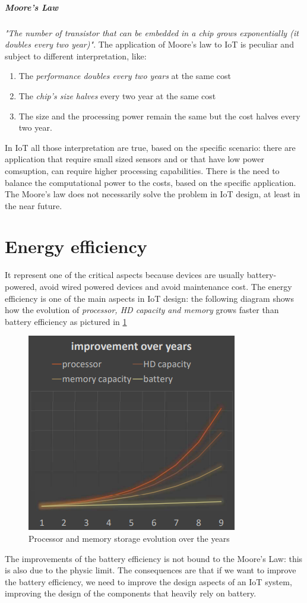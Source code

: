 \documentclass[10pt,a4paper]{report}
\theoremstyle{definition}
\begin{document}
\subparagraph{Moore's Law}\label{sec:moores-law}
\textit{"The number of transistor that can be embedded in a chip grows exponentially (it doubles every two year)"}.
The application of Moore's law to IoT is peculiar and subject to different interpretation, like: 
\begin{enumerate}
	\item 
	The \textit{performance doubles every two years} at the same cost
	\item 
	The \textit{chip's size halves} every two year at the same cost
	\item 
	The size and the processing power remain the same but the cost halves every two year.
	
\end{enumerate}
In IoT all those interpretation are true, based on the specific scenario: there are application that require small sized sensors and or that have low power comsuption, can require higher processing capabilities. There is the need to balance the computational power to the costs, based on the specific application.\\
The Moore's law does not necessarily solve the problem in IoT design, at least in the near future.
\section{Energy efficiency}\label{sec:energy-efficiency}
It represent one of the critical aspects because devices are usually battery-powered, avoid wired powered devices and avoid maintenance cost.
The energy efficiency is one of the main aspects in IoT design: the following diagram shows how the evolution of \textit{processor, HD capacity and memory} grows faster than battery efficiency as pictured in \ref{processor-vs-capacity}
\begin{figure}[h]
	\centering\includegraphics[scale=0.50]{images/Pasted image 20230324162428.png}
	\caption{Processor and memory storage evolution over the years}
	\label{processor-vs-capacity}
\end{figure}
The improvements of the battery efficiency is not bound to the Moore's Law: this is also due to the physic limit. The consequences are that if we want to improve the battery efficiency, we need to improve the design aspects of an IoT system, improving the design of the components that heavily rely on battery.
\end{document}
